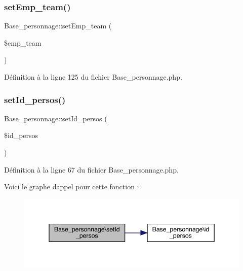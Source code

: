 \subsubsection{\texorpdfstring{set\+Emp\+\_\+team()}{setEmp\_team()}}
{\footnotesize\ttfamily Base\+\_\+personnage\+::set\+Emp\+\_\+team (\begin{DoxyParamCaption}\item[{}]{\$emp\+\_\+team }\end{DoxyParamCaption})}



Définition à la ligne 125 du fichier Base\+\_\+personnage.\+php.

\mbox{\label{class_base__personnage_a14498c5c6a7ced9420401351eacf2ecf}} 
\subsubsection{\texorpdfstring{set\+Id\+\_\+persos()}{setId\_persos()}}
{\footnotesize\ttfamily Base\+\_\+personnage\+::set\+Id\+\_\+persos (\begin{DoxyParamCaption}\item[{}]{\$id\+\_\+persos }\end{DoxyParamCaption})}



Définition à la ligne 67 du fichier Base\+\_\+personnage.\+php.

Voici le graphe d\textquotesingle{}appel pour cette fonction \+:\nopagebreak
\begin{figure}[H]
\begin{center}
\leavevmode
\includegraphics[width=345pt]{class_base__personnage_a14498c5c6a7ced9420401351eacf2ecf_cgraph}
\end{center}
\end{figure}
\mbox{\label{class_base__personnage_a44eae499b82470a6c99e01b68a73a6d9}} 
